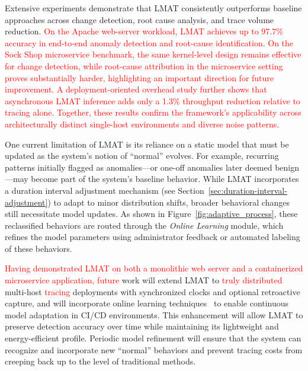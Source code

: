 \documentclass[preprint,12pt]{elsarticle}
\begin{document}
Extensive experiments demonstrate that LMAT consistently outperforms baseline approaches across change detection, root cause analysis, and trace volume reduction. \textcolor{red}{On the Apache web-server workload, LMAT achieves up to 97.7\% accuracy in end-to-end anomaly detection and root-cause identification. On the Sock Shop microservice benchmark, the same kernel-level design remains effective for change detection, while root-cause attribution in the microservice setting proves substantially harder, highlighting an important direction for future improvement. A deployment-oriented overhead study further shows that asynchronous LMAT inference adds only a 1.3\% throughput reduction relative to tracing alone. Together, these results confirm the framework’s applicability across architecturally distinct single-host environments and diverse noise patterns.}


One current limitation of LMAT is its reliance on a static model that must be updated as the system’s notion of ``normal'' evolves. For example, recurring patterns initially flagged as anomalies—or one-off anomalies later deemed benign—may become part of the system’s baseline behavior. While LMAT incorporates a duration interval adjustment mechanism (see Section~\ref{sec:duration-interval-adjustment}) to adapt to minor distribution shifts, broader behavioral changes still necessitate model updates. As shown in Figure~\ref{fig:adaptive_process}, these reclassified behaviors are routed through the \emph{Online Learning} module, which refines the model parameters using administrator feedback or automated labeling of these behaviors.

\textcolor{red}{Having demonstrated LMAT on both a monolithic web server and a containerized microservice application, future} work will extend LMAT to \textcolor{red}{truly distributed} multi-host \textcolor{red}{tracing} deployments with synchronized clocks and optional retroactive capture, and will incorporate online learning techniques~\cite{shalev2012online} to enable continuous model adaptation in CI/CD environments. This enhancement will allow LMAT to preserve detection accuracy over time while maintaining its lightweight and energy-efficient profile. Periodic model refinement will ensure that the system can recognize and incorporate new ``normal'' behaviors and prevent tracing costs from creeping back up to the level of traditional methods.



\nocite{*}

\end{document}
